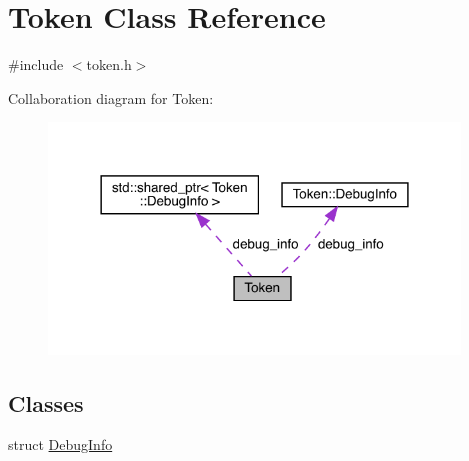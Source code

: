 \hypertarget{class_token}{}\section{Token Class Reference}
\label{class_token}


{\ttfamily \#include $<$token.\+h$>$}



Collaboration diagram for Token\+:\nopagebreak
\begin{figure}[H]
\begin{center}
\leavevmode
\includegraphics[width=310pt]{class_token__coll__graph}
\end{center}
\end{figure}
\subsection*{Classes}
\begin{DoxyCompactItemize}
\item 
struct \hyperlink{struct_token_1_1_debug_info}{Debug\+Info}
\end{DoxyCompactItemize}
